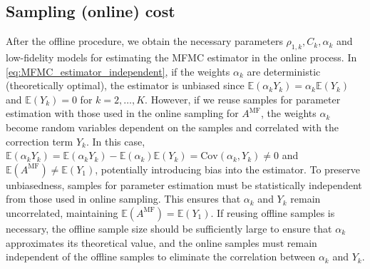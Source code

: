 \subsection{Sampling (online) cost}
After the offline procedure, we obtain the necessary parameters $\rho_{1,k}, C_k,\alpha_k $ and low-fidelity models for estimating the MFMC estimator in the online process. In \eqref{eq:MFMC_estimator_independent}, if the weights $\alpha_k$ are deterministic (theoretically optimal), the estimator is unbiased since $\mathbb{E}(\alpha_k Y_k) = \alpha_k \mathbb{E}(Y_k)$ and $\mathbb{E}(Y_k) = 0$ for $k=2,\ldots, K$. However, if we reuse samples for parameter estimation with those used in the online sampling for $A^{\text{MF}}$, the weights $\alpha_k$ become random variables dependent on the samples and correlated with the correction term $Y_k$. In this case, $\mathbb{E}(\alpha_k Y_k) = \mathbb{E}(\alpha_k Y_k)-\mathbb{E}(\alpha_k)\mathbb{E}(Y_k) = \text{Cov}(\alpha_k,Y_k)\neq 0$ and $\mathbb{E}(A^{\text{MF}})\neq \mathbb{E}(Y_1)$, potentially introducing bias into the estimator. To preserve unbiasedness, samples for parameter estimation must be statistically independent from those used in online sampling. This ensures that $\alpha_k$ and $Y_k$ remain uncorrelated, maintaining $\mathbb{E}(A^{\text{MF}})= \mathbb{E}(Y_1)$.
If reusing offline samples is necessary, the offline sample size should be sufficiently large to ensure that $\alpha_k$ approximates its theoretical value, and the online samples must remain independent of the offline samples to eliminate the correlation between $\alpha_k$ and $Y_k$.












